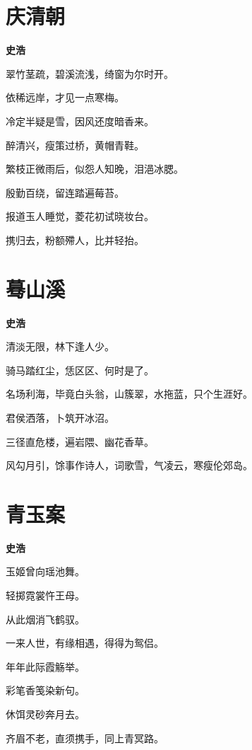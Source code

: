 \documentclass[12pt,a4paper]{ctexbook}
\begin{document}
\section{庆清朝}
\textbf{史浩}\par\vspace{0.5em}
翠竹茎疏，碧溪流浅，绮窗为尔时开。\par
依稀远岸，才见一点寒梅。\par
冷定半疑是雪，因风还度暗香来。\par
醉清兴，瘦策过桥，黄帽青鞋。\par
繁枝正微雨后，似怨人知晚，泪浥冰腮。\par
殷勤百绕，留连踏遍莓苔。\par
报道玉人睡觉，菱花初试晓妆台。\par
携归去，粉额殢人，比并轻抬。\par

\section{蓦山溪}
\textbf{史浩}\par\vspace{0.5em}
清淡无限，林下逢人少。\par
骑马踏红尘，恁区区、何时是了。\par
名场利海，毕竟白头翁，山簇翠，水拖蓝，只个生涯好。\par
君侯洒落，卜筑开冰沼。\par
三径直危楼，遍岩隈、幽花香草。\par
风勾月引，馀事作诗人，词歌雪，气凌云，寒瘦伦郊岛。\par

\section{青玉案}
\textbf{史浩}\par\vspace{0.5em}
玉姬曾向瑶池舞。\par
轻掷霓裳忤王母。\par
从此烟消飞鹤驭。\par
一来人世，有缘相遇，得得为鸳侣。\par
年年此际霞觞举。\par
彩笔香笺染新句。\par
休饵灵砂奔月去。\par
齐眉不老，直须携手，同上青冥路。\par
\end{document}
